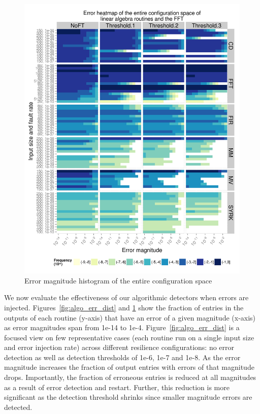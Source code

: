 \documentclass{sig-alternate}
\begin{document}
\begin{figure}[ht!]
\centering
\includegraphics[width=1.00\columnwidth]{figs/4_1_1_Exp2_2_Heatmap_Error_ConfSpace.png}
\caption{Error magnitude histogram of the entire configuration space}
\label{fig:algo_err_heatmap}
\end{figure}

We now evaluate the effectiveness of our algorithmic detectors when errors are injected.
Figures~\ref{fig:algo_err_dist} and \ref{fig:algo_err_heatmap} show the fraction of entries in the outputs of each routine (y-axis) that have an error of a given magnitude (x-axis) as error magnitudes span from 1e-14 to 1e-4.
Figure~\ref{fig:algo_err_dist} is a focused view on few representative cases (each routine run on a single input size and error injection rate) across different resilience configurations: no error detection as well as detection thresholds of 1e-6, 1e-7 and 1e-8.
As the error magnitude increases the fraction of output entries with errors of that magnitude drops.
Importantly, the fraction of erroneous entries is reduced at all magnitudes as a result of error detection and restart.
Further, this reduction is more significant as the detection threshold shrinks since smaller magnitude errors are detected.
\end{document}
